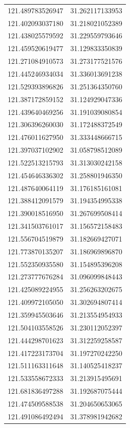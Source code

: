 \documentclass{mcmthesis}
\begin{document}
\begin{appendices}
\begin{table}[htbp]
\begin{tabular}{|c|c|}
    121.489783526947  & 31.262117133953  \\
    121.402093037180  & 31.218021052389  \\
    121.438025579592  & 31.229559793646  \\
    121.459520619477  & 31.129833350839  \\
    121.271084910573  & 31.273177521576  \\
    121.445246934034  & 31.336013691238  \\
    121.529393896826  & 31.251364350760  \\
    121.387172859152  & 31.124929047336  \\
    121.439640469256  & 31.191039080854  \\
    121.306396260030  & 31.172488372549  \\
    121.476011627950  & 31.333448666715  \\
    121.397037102902  & 31.058798512089  \\
    121.522513215793  & 31.313030242158  \\
    121.454646336302  & 31.258801946350  \\
    121.487640064119  & 31.176185161081  \\
    121.388412091579  & 31.194354995338  \\
    121.390018516950  & 31.267699508414  \\
    121.341503761017  & 31.156572158483  \\
    121.556704519879  & 31.182669427071  \\
    121.773870135207  & 31.186969896870  \\
    121.552350935580  & 31.154895396208  \\
    121.273777676284  & 31.096099848443  \\
    121.425089224955  & 31.256263202675  \\
    121.409972105050  & 31.302694807414  \\
    121.359945503646  & 31.213554954933  \\
    121.504103558526  & 31.230112052397  \\
    121.444298701623  & 31.312259258587  \\
    121.417223173704  & 31.197270242250  \\
    121.511163311648  & 31.140525418237  \\
    121.533558672333  & 31.213915495691  \\
    121.681836497288  & 31.192687075444  \\
    121.474509588538  & 31.204650653065  \\
    121.491086492494  & 31.378981942682  \\
    \hline
    \end{tabular}%
  \label{tab:addlabel}%
\end{table}%


\end{appendices}
\end{document}

